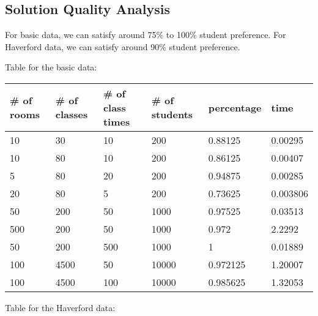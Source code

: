 \documentclass[11pt, oneside]{article}   	%
\begin{document}
\subsection{Solution Quality Analysis}
For basic data, we can satisfy around 75\% to 100\% student preference. For Haverford data, we can satisfy around 90\% student preference. %

Table for the basic data:
\begin{table}[h]
\begin{tabular}{|l|l|l|l|l|l|}
\hline
\# of rooms & \# of classes & \# of class times & \# of students & percentage & time     \\ \hline
10          & 30            & 10                & 200            & 0.88125    & 0.00295  \\ \hline
10          & 80            & 10                & 200            & 0.86125    & 0.00407  \\ \hline
5           & 80            & 20                & 200            & 0.94875    & 0.00285  \\ \hline
20          & 80            & 5                 & 200            & 0.73625    & 0.003806 \\ \hline
50          & 200           & 50                & 1000           & 0.97525    & 0.03513  \\ \hline
500         & 200           & 50                & 1000           & 0.972      & 2.2292   \\ \hline
50          & 200           & 500               & 1000           & 1          & 0.01889  \\ \hline
100         & 4500          & 50                & 10000          & 0.972125   & 1.20007  \\ \hline
100         & 4500          & 100               & 10000          & 0.985625   & 1.32053  \\ \hline
\end{tabular}
\end{table}

Table for the Haverford data:


\end{document}
